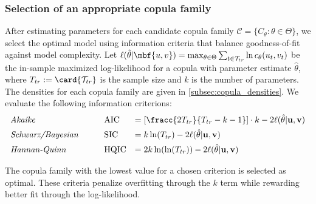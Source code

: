\subsubsection{Selection of an appropriate copula family}

After estimating parameters for each candidate copula family $\mathcal{C} = \{C_\theta : \theta \in \Theta\}$, we select the optimal model using information criteria that balance goodness-of-fit against model complexity. Let $\ell(\hat{\theta}|\mbf {u,v}) = \max_{\theta\in\Theta} \sum_{t\in\mathcal T_{tr}} \ln c_{{\theta}}(u_t, v_t)$ be the in-sample maximized log-likelihood for a copula with parameter estimate $\hat{\theta}$, where $T_{tr}:=\card{\mathcal T_{tr}}$ is the sample size and $k$ is the number of parameters. 
The densities for each copula family are given in \cref{subsec:copula_densities}.
We evaluate the following information criterions:
$$
\begin{array}{lllll}
\text{\textit{Akaike}} &&& \text{AIC} &= [\fracc{2T_{tr}}{T_{tr}-k-1}] \cdot k - 2\ell(\hat{\theta}|\mathbf{u,v})
\\[0.44em]
\text{\textit{Schwarz/Bayesian}} &&& \text{SIC} &= k\ln(T_{tr}) - 2\ell(\hat{\theta}|\mathbf{u,v})
\\[0.44em]
\text{\textit{Hannan-Quinn}} &&& \text{HQIC} &= 2k\ln(\ln(T_{tr})) - 2\ell(\hat{\theta}|\mathbf{u,v})
\end{array}
$$

The copula family with the lowest value for a chosen criterion is selected as optimal. These criteria penalize overfitting through the $k$ term while rewarding better fit through the log-likelihood.



